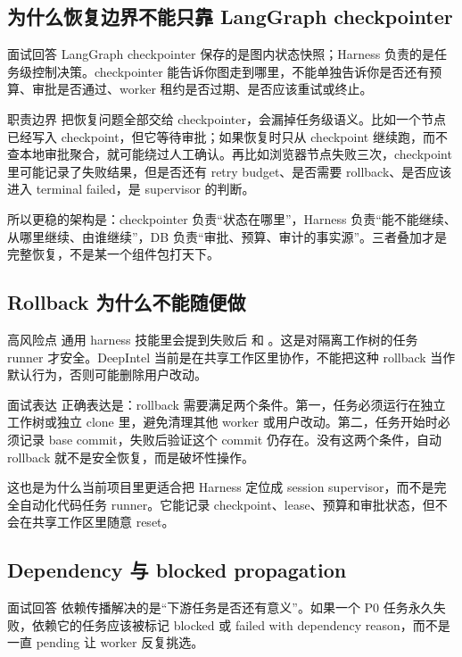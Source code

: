 \subsection{为什么恢复边界不能只靠 LangGraph checkpointer}
\begin{qaBox}{面试回答}
LangGraph checkpointer 保存的是图内状态快照；Harness 负责的是任务级控制决策。checkpointer 能告诉你图走到哪里，不能单独告诉你是否还有预算、审批是否通过、worker 租约是否过期、是否应该重试或终止。
\end{qaBox}

\begin{analysisBox}{职责边界}
把恢复问题全部交给 checkpointer，会漏掉任务级语义。比如一个节点已经写入 checkpoint，但它等待审批；如果恢复时只从 checkpoint 继续跑，而不查本地审批聚合，就可能绕过人工确认。再比如浏览器节点失败三次，checkpoint 里可能记录了失败结果，但是否还有 retry budget、是否需要 rollback、是否应该进入 terminal failed，是 supervisor 的判断。

所以更稳的架构是：checkpointer 负责“状态在哪里”，Harness 负责“能不能继续、从哪里继续、由谁继续”，DB 负责“审批、预算、审计的事实源”。三者叠加才是完整恢复，不是某一个组件包打天下。
\end{analysisBox}

\subsection{Rollback 为什么不能随便做}
\begin{riskBox}{高风险点}
通用 harness 技能里会提到失败后  和 。这是对隔离工作树的任务 runner 才安全。DeepIntel 当前是在共享工作区里协作，不能把这种 rollback 当作默认行为，否则可能删除用户改动。
\end{riskBox}

\begin{analysisBox}{面试表达}
正确表达是：rollback 需要满足两个条件。第一，任务必须运行在独立工作树或独立 clone 里，避免清理其他 worker 或用户改动。第二，任务开始时必须记录 base commit，失败后验证这个 commit 仍存在。没有这两个条件，自动 rollback 就不是安全恢复，而是破坏性操作。

这也是为什么当前项目里更适合把 Harness 定位成 session supervisor，而不是完全自动化代码任务 runner。它能记录 checkpoint、lease、预算和审批状态，但不会在共享工作区里随意 reset。
\end{analysisBox}

\subsection{Dependency 与 blocked propagation}
\begin{qaBox}{面试回答}
依赖传播解决的是“下游任务是否还有意义”。如果一个 P0 任务永久失败，依赖它的任务应该被标记 blocked 或 failed with dependency reason，而不是一直 pending 让 worker 反复挑选。
\end{qaBox}

